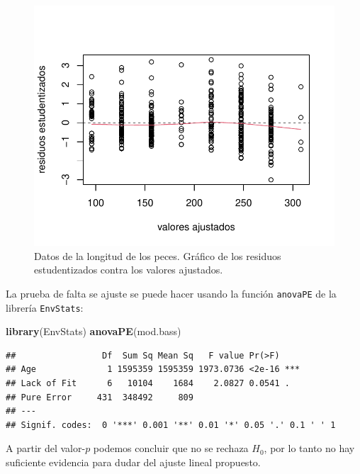 \documentclass[
]{article}
\newenvironment{Shaded}{\begin{snugshade}}{\end{snugshade}}
\newcommand{\FunctionTok}[1]{\textcolor[rgb]{0.13,0.29,0.53}{\textbf{#1}}}
\newcommand{\NormalTok}[1]{#1}
\begin{document}
\begin{figure}

{\centering \includegraphics{MLG1_files/figure-latex/pecesResiduos1-1} 

}

\caption{Datos de la longitud de los peces. Gráfico de los residuos estudentizados contra los valores ajustados.}\label{fig:pecesResiduos1}
\end{figure}

La prueba de falta se ajuste se puede hacer usando la función \texttt{anovaPE} de la librería \texttt{EnvStats}:

\begin{Shaded}
\begin{Highlighting}[]
\FunctionTok{library}\NormalTok{(EnvStats)}
\FunctionTok{anovaPE}\NormalTok{(mod.bass)}
\end{Highlighting}
\end{Shaded}

\begin{verbatim}
##                 Df  Sum Sq Mean Sq   F value Pr(>F)    
## Age              1 1595359 1595359 1973.0736 <2e-16 ***
## Lack of Fit      6   10104    1684    2.0827 0.0541 .  
## Pure Error     431  348492     809                     
## ---
## Signif. codes:  0 '***' 0.001 '**' 0.01 '*' 0.05 '.' 0.1 ' ' 1
\end{verbatim}

A partir del valor-\(p\) podemos concluir que no se rechaza \(H_{0}\), por lo tanto no hay suficiente evidencia para dudar del ajuste lineal propuesto.
\end{document}
